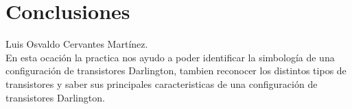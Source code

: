\documentclass[10pt,a4paper]{article}
\begin{document}
\section{Conclusiones}

Luis Osvaldo Cervantes Mart\'inez.\\
En esta ocación la practica nos ayudo a poder identificar la simbología de una configuración de transistores Darlington, tambien reconocer los distintos tipos de transistores y saber sus principales caracteristicas de una configuración  de transistores Darlington.
 
\end{document}
